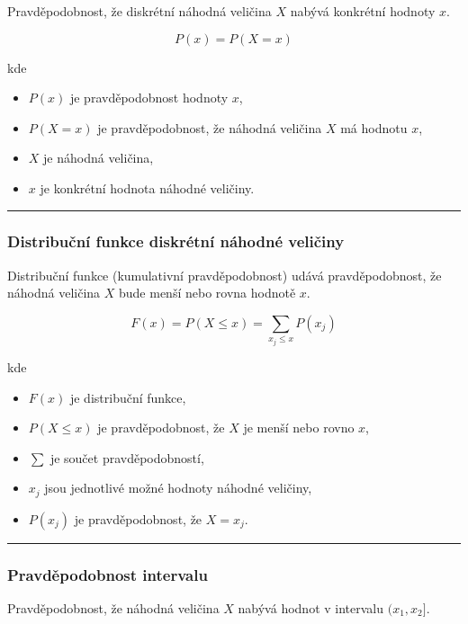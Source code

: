 \documentclass[a4paper, 11pt]{article}
\begin{document}
Pravděpodobnost, že diskrétní náhodná veličina $X$
nabývá konkrétní hodnoty $x$.

\begin{equation*}
	P(x) = P(X = x)
\end{equation*}

kde

\begin{itemize}[noitemsep]
	\item $P(x)$ je pravděpodobnost hodnoty $x$,
	\item $P(X = x)$ je pravděpodobnost, že náhodná veličina $X$ má hodnotu $x$,
	\item $X$ je náhodná veličina,
	\item $x$ je konkrétní hodnota náhodné veličiny.
\end{itemize}

\noindent\hrule\medskip

\subsubsection{Distribuční funkce diskrétní náhodné veličiny}

Distribuční funkce (kumulativní pravděpodobnost) udává
pravděpodobnost, že náhodná veličina $X$ bude menší
nebo rovna hodnotě $x$.

\begin{equation*}
	F(x) = P(X \le x) = \sum_{x_j \le x} P(x_j)
\end{equation*}

kde

\begin{itemize}[noitemsep]
	\item $F(x)$ je distribuční funkce,
	\item $P(X \le x)$ je pravděpodobnost, že $X$ je menší nebo rovno $x$,
	\item $\sum$ je součet pravděpodobností,
	\item $x_j$ jsou jednotlivé možné hodnoty náhodné veličiny,
	\item $P(x_j)$ je pravděpodobnost, že $X = x_j$.
\end{itemize}

\noindent\hrule\medskip

\subsubsection{Pravděpodobnost intervalu}

Pravděpodobnost, že náhodná veličina $X$ nabývá hodnot
v intervalu $(x_1, x_2]$.
\end{document}
